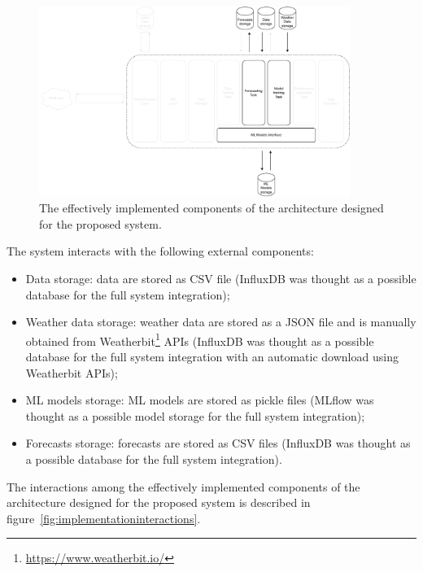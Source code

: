 \begin{figure}[H]
\centering
\includegraphics[width=0.9\textwidth]{images/implementation_components}
\caption{The effectively implemented components of the architecture designed for the proposed system.}
\label{fig:implementationcomponents}
\end{figure}

The system interacts with the following external components:
\begin{itemize}
  \item Data storage: data are stored as CSV file (InfluxDB was thought as a possible database for the full system integration);
  \item Weather data storage: weather data are stored as a JSON file and is manually obtained from Weatherbit\footnote{ \url{https://www.weatherbit.io/} } APIs (InfluxDB was thought as a possible database for the full system integration with an automatic download using Weatherbit APIs);
  \item ML models storage: ML models are stored as pickle files (MLflow was thought as a possible model storage for the full system integration);
  \item Forecasts storage: forecasts are stored as CSV files (InfluxDB was thought as a possible database for the full system integration).
\end{itemize}

The interactions among the effectively implemented components of the architecture designed for the proposed system is described in figure~\ref{fig:implementationinteractions}.

